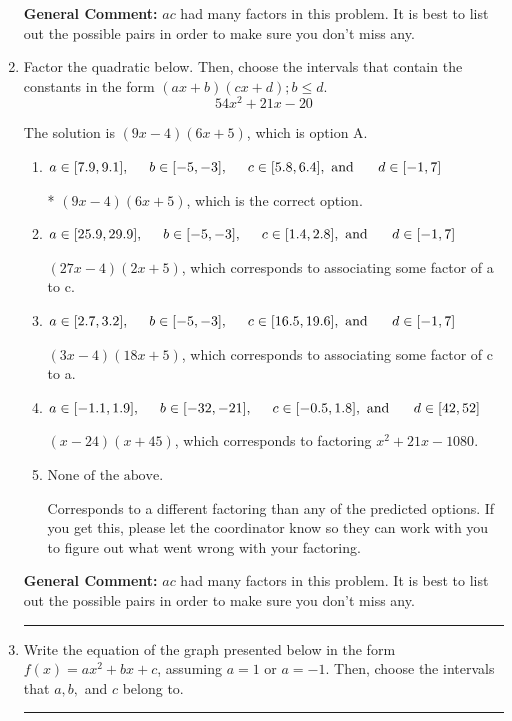 \documentclass{extbook}[14pt]
\newcommand{\litem}[1]{\item #1

\rule{\textwidth}{0.4pt}}
\begin{document}
\begin{enumerate}
{\textbf{General Comment:} $ac$ had many factors in this problem. It is best to list out the possible pairs in order to make sure you don't miss any.
}
\litem{
Factor the quadratic below. Then, choose the intervals that contain the constants in the form $(ax+b)(cx+d); b \leq d.$
\[ 54x^{2} +21 x -20 \]

The solution is \( (9x -4)(6x + 5) \), which is option A.\begin{enumerate}[label=\Alph*.]
\item \( a \in [7.9, 9.1], \hspace*{5mm} b \in [-5, -3], \hspace*{5mm} c \in [5.8, 6.4], \text{ and } \hspace*{5mm} d \in [-1, 7] \)

* $(9x -4)(6x + 5)$, which is the correct option.
\item \( a \in [25.9, 29.9], \hspace*{5mm} b \in [-5, -3], \hspace*{5mm} c \in [1.4, 2.8], \text{ and } \hspace*{5mm} d \in [-1, 7] \)

 $(27x -4)(2x + 5)$, which corresponds to associating some factor of a to c.
\item \( a \in [2.7, 3.2], \hspace*{5mm} b \in [-5, -3], \hspace*{5mm} c \in [16.5, 19.6], \text{ and } \hspace*{5mm} d \in [-1, 7] \)

 $(3x -4)(18x + 5)$, which corresponds to associating some factor of c to a.
\item \( a \in [-1.1, 1.9], \hspace*{5mm} b \in [-32, -21], \hspace*{5mm} c \in [-0.5, 1.8], \text{ and } \hspace*{5mm} d \in [42, 52] \)

 $(x -24)(x + 45)$, which corresponds to factoring $x^{2} +21 x -1080$.
\item \( \text{None of the above.} \)

 Corresponds to a different factoring than any of the predicted options. If you get this, please let the coordinator know so they can work with you to figure out what went wrong with your factoring.
\end{enumerate}

\textbf{General Comment:} $ac$ had many factors in this problem. It is best to list out the possible pairs in order to make sure you don't miss any.
}
\litem{
Write the equation of the graph presented below in the form $f(x)=ax^2+bx+c$, assuming  $a=1$ or $a=-1$. Then, choose the intervals that $a, b,$ and $c$ belong to.

}
\end{enumerate}
\end{document}
